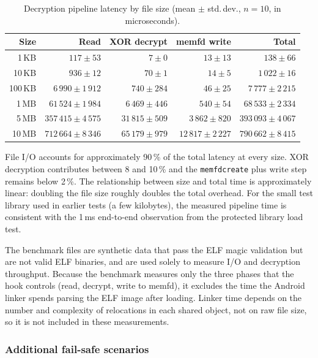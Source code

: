 \documentclass[11pt,a4paper]{report}
\renewcommand\_{{\textunderscore\allowbreak}}
\begin{document}
\begin{table}[h]
\centering
\caption{Decryption pipeline latency by file size (mean $\pm$ std.\,dev., $n{=}10$, in microseconds).}
\label{tab:benchmark}
\begin{tabular}{r r r r r}
    \hline
    \textbf{Size} & \textbf{Read} & \textbf{XOR decrypt} & \textbf{memfd write} & \textbf{Total} \\
    \hline
    1\,KB   & $117 \pm 53$     & $7 \pm 0$       & $13 \pm 13$       & $138 \pm 66$ \\
    10\,KB  & $936 \pm 12$     & $70 \pm 1$      & $14 \pm 5$      & $1\,022 \pm 16$ \\
    100\,KB & $6\,990 \pm 1\,912$ & $740 \pm 284$  & $46 \pm 25$    & $7\,777 \pm 2\,215$ \\
    1\,MB   & $61\,524 \pm 1\,984$   & $6\,469 \pm 446$ & $540 \pm 54$  & $68\,533 \pm 2\,334$ \\
    5\,MB   & $357\,415 \pm 4\,575$ & $31\,815 \pm 509$ & $3\,862 \pm 820$ & $393\,093 \pm 4\,067$ \\
    10\,MB  & $712\,664 \pm 8\,346$ & $65\,179 \pm 979$ & $12\,817 \pm 2\,227$ & $790\,662 \pm 8\,415$ \\
    \hline
\end{tabular}
\end{table}

File I/O accounts for approximately 90\,\% of the total latency at every size. XOR decryption contributes between 8 and 10\,\% and the \texttt{memfd\_create} plus write step remains below 2\,\%. The relationship between size and total time is approximately linear: doubling the file size roughly doubles the total overhead. For the small test library used in earlier tests (a few kilobytes), the measured pipeline time is consistent with the 1\,ms end-to-end observation from the protected library load test.

The benchmark files are synthetic data that pass the ELF magic validation but are not valid ELF binaries, and are used solely to measure I/O and decryption throughput. Because the benchmark measures only the three phases that the hook controls (read, decrypt, write to memfd), it excludes the time the Android linker spends parsing the ELF image after loading. Linker time depends on the number and complexity of relocations in each shared object, not on raw file size, so it is not included in these measurements.

\subsubsection{Additional fail-safe scenarios}
\end{document}
